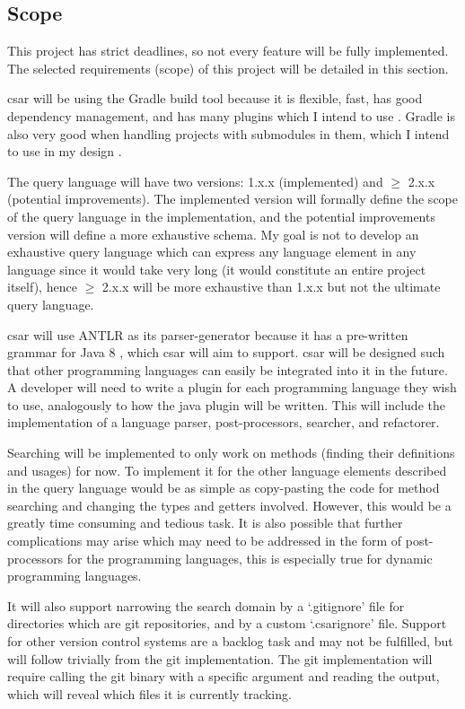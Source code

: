 \documentclass[12pt, letterpaper]{article}
\begin{document}
\subsection{Scope}
This project has strict deadlines, so not every feature will be fully implemented.
The selected requirements (scope) of this project will be detailed in this section.

csar will be using the Gradle build tool because it is flexible, fast, has good dependency management, and has many plugins which I intend to use \autocite{mavenvsgradle}.
Gradle is also very good when handling projects with submodules in them, which I intend to use in my design \autocite{drdobbswhyusegradle}.

The query language will have two versions: 1.x.x (implemented) and $ \geq $ 2.x.x (potential improvements).
The implemented version will formally define the scope of the query language in the implementation, and the potential improvements version will define a more exhaustive schema.
My goal is not to develop an exhaustive query language which can express any language element in any language since it would take very long (it would constitute an entire project itself), hence $ \geq $ 2.x.x will be more exhaustive than 1.x.x but not the ultimate query language.

csar will use ANTLR as its parser-generator because it has a pre-written grammar for Java 8 \autocite{CodeReferences}, which csar will aim to support.
csar will be designed such that other programming languages can easily be integrated into it in the future.
A developer will need to write a plugin for each programming language they wish to use, analogously to how the java plugin will be written.
This will include the implementation of a language parser, post-processors, searcher, and refactorer.

Searching will be implemented to only work on methods (finding their definitions and usages) for now.
To implement it for the other language elements described in the query language would be as simple as copy-pasting the code for method searching and changing the types and getters involved.
However, this would be a greatly time consuming and tedious task.
It is also possible that further complications may arise which may need to be addressed in the form of post-processors for the programming languages, this is especially true for dynamic programming languages.

It will also support narrowing the search domain by a `.gitignore' file for directories which are git repositories, and by a custom `.csarignore' file.
Support for other version control systems are a backlog task and may not be fulfilled, but will follow trivially from the git implementation.
The git implementation will require calling the git binary with a specific argument and reading the output, which will reveal which files it is currently tracking.
\end{document}

